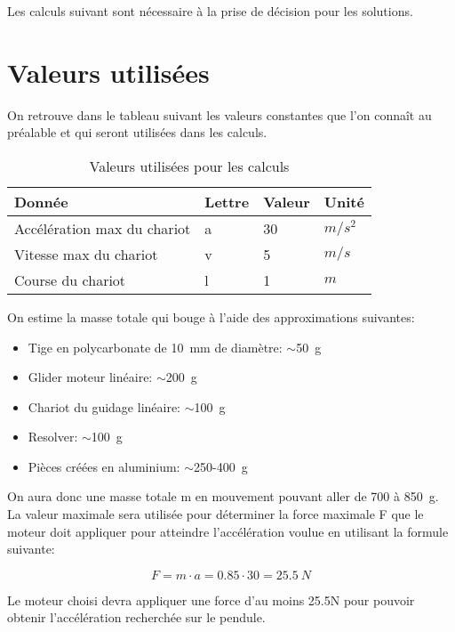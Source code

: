 Les calculs suivant sont nécessaire à la prise de décision pour les solutions.

\section{Valeurs utilisées}\label{sec:ValUtil}
On retrouve dans le tableau suivant les valeurs constantes que l'on connaît au préalable et qui seront utilisées dans les calculs.

\begin{table}[H]
  \centering
  \caption{Valeurs utilisées pour les calculs}
  \label{tab:ValUtil}
  \begin{tabular}{|l|l|l|l|}
    \hline
    Donnée                      & Lettre & Valeur & Unité   \\ \hline
    Accélération max du chariot & a      & 30     & $m/s^2$ \\ \hline
    Vitesse max du chariot      & v      & 5      & $m/s$   \\ \hline
    Course du chariot           & l      & 1      & $m$     \\ \hline
  \end{tabular}%
\end{table}

On estime la masse totale qui bouge à l'aide des approximations suivantes:
\begin{itemize}
  \item Tige en polycarbonate de 10~mm de diamètre: $\sim$50~g
  \item Glider moteur linéaire: $\sim$200~g
  \item Chariot du guidage linéaire: $\sim$100~g
  \item Resolver: $\sim$100~g
  \item Pièces créées en aluminium: $\sim$250-400~g
\end{itemize}

On aura donc une masse totale m en mouvement pouvant aller de 700 à 850~g. La valeur maximale sera utilisée pour déterminer la force maximale F
que le moteur doit appliquer pour atteindre l'accélération voulue en utilisant la formule suivante:

\begin{equation}\label{eq:ForceMot}
  F = m \cdot a = 0.85 \cdot 30 = 25.5~N
\end{equation}

Le moteur choisi devra appliquer une force d'au moins 25.5N pour pouvoir obtenir l'accélération recherchée sur le pendule.\\

